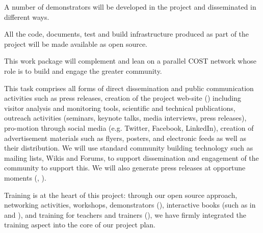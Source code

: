 \begin{workpackage}
\begin{wpdescription}
  A number of demonstrators will be developed in the project and
  disseminated in different ways.

  All the code, documents, test and build infrastructure produced as
  part of the project will be made available as open source.

  This work package will complement and lean on a parallel COST
  network whose role is to build and engage the greater community.
\end{wpdescription}

\begin{tasklist}

\begin{task}[title=Dissemination and Communication activities, lead=PS, partners={SA}, id=dissemination-communication, PM=11, wphases=0-48 ]

  This task comprises all forms of direct dissemination and public
  communication activities such as press releases, creation of the
  project web-site () including visitor analysis and monitoring tools,
  scientific and technical publications, outreach activities
  (seminars, keynote talks, media interviews, press releases),
  pro-motion through social media (e.g. Twitter, Facebook, LinkedIn),
  creation of advertisement materials such as flyers, posters, and
  electronic feeds as well as their distribution. We will use standard
  community building technology such as mailing lists, Wikis and
  Forums, to support dissemination and engagement of the community to
  support this. We will also generate press releases at opportune
  moments (, ). %


\end{task}

\begin{task}[title=Training and training portal,
id=training-portal,lead=PS,PM=1,wphases=0-1]
Training is at the heart of this project: through our open source
approach, networking activities, workshops, demonstrators
(), interactive books (such
as in  and
), and training for teachers and trainers
(), we have firmly integrated the training
aspect into the core of our project plan.


\end{task}
\end{tasklist}
\end{workpackage}

